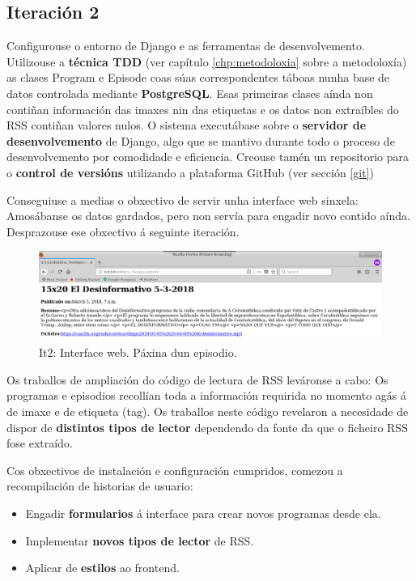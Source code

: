 \subsection{Iteración 2}

Configurouse o entorno de Django e as ferramentas de desenvolvemento. Utilizouse a \textbf{técnica TDD} (ver capítulo \ref{chp:metodoloxia} sobre a metodoloxía) as clases Program e Episode coas súas correspondentes táboas nunha base de datos controlada mediante \textbf{PostgreSQL}. Esas primeiras clases aínda non contiñan información das imaxes nin das etiquetas e os datos non extraíbles do RSS contiñan valores nulos. O sistema executábase sobre o \textbf{servidor de desenvolvemento} de Django, algo que se mantivo durante todo o proceso de desenvolvemento por comodidade e eficiencia. Creouse tamén un repositorio para o \textbf{control de versións} utilizando a plataforma GitHub (ver sección \ref{git})

Conseguiuse a medias o obxectivo de servir unha interface web sinxela: Amosábanse os datos gardados, pero non servía para engadir novo contido aínda. Desprazouse ese obxectivo á seguinte iteración.

\begin{figure}[h]
	\centering
	\includegraphics[scale=0.3,keepaspectratio=true]{./images/it2_episode.png}
	\caption{It2: Interface web. Páxina dun episodio.}
	\label{fig:it2_episode}
\end{figure}

Os traballos de ampliación do código de lectura de RSS leváronse a cabo: Os programas e episodios recollían toda a información requirida no momento agás á de imaxe e de etiqueta (tag). Os traballos neste código revelaron a necesidade de dispor de \textbf{distintos tipos de lector} dependendo da fonte da que o ficheiro RSS fose extraído. 

Cos obxectivos de instalación e configuración cumpridos, comezou a recompilación de historias de usuario: 

\begin{itemize}
	\item Engadir \textbf{formularios} á interface para crear novos programas desde ela.
	\item Implementar \textbf{novos tipos de lector} de RSS.
	\item Aplicar  de \textbf{estilos} ao frontend. 
\end{itemize}

